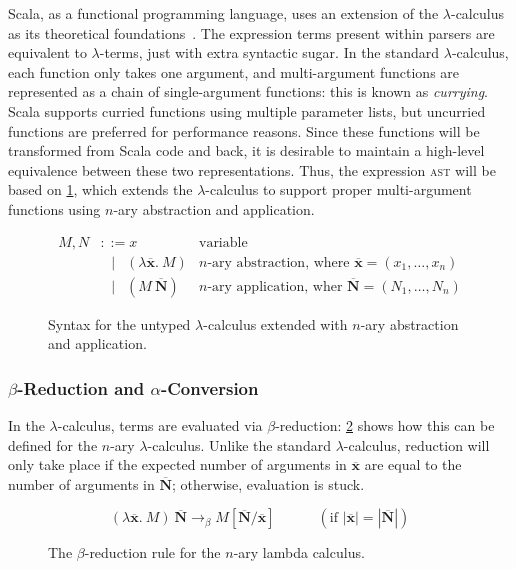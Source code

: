 \documentclass[../../../main.tex]{subfiles}
\begin{document}
Scala, as a functional programming language, uses an extension of the $\lambda$-calculus~\cite{church_lambda_1936} as its theoretical foundations~\cite{cremet_core_2006,amin_essence_2016}.
The expression terms present within parsers are equivalent to $\lambda$-terms, just with extra syntactic sugar.
In the standard $\lambda$-calculus, each function only takes one argument, and multi-argument functions are represented as a chain of single-argument functions: this is known as \emph{currying}.
Scala supports curried functions using multiple parameter lists, but uncurried functions are preferred for performance reasons.
Since these functions will be transformed from Scala code and back, it is desirable to maintain a high-level equivalence between these two representations.
Thus, the expression \textsc{ast} will be based on \cref{fig:lambda-calculus}, which extends the $\lambda$-calculus to support proper multi-argument functions using $n$-ary abstraction and application.

\begin{figure}
\begin{align*}
M, N &\mathrel{::=} x & \text{variable} \\
&\mathrel{\enspace\mid\enspace} (\lambda \overline{\mathbf{x}}.\ M) & \text{$n$-ary abstraction, where } \overline{\mathbf{x}} = (x_1, \ldots, x_n) \\
&\mathrel{\enspace\mid\enspace} (M\ \overline{\mathbf{N}}) & \text{$n$-ary application, wher } \overline{\mathbf{N}} = (N_1, \ldots, N_n)
\end{align*}
\caption{Syntax for the untyped $\lambda$-calculus extended with $n$-ary abstraction and application.}
\label{fig:lambda-calculus}
\end{figure}

\subsubsection{$\beta$-Reduction and $\alpha$-Conversion}
In the $\lambda$-calculus, terms are evaluated via $\beta$-reduction: \cref{fig:beta-reduction} shows how this can be defined for the $n$-ary $\lambda$-calculus.
Unlike the standard $\lambda$-calculus, reduction will only take place if the expected number of arguments in $\overline{\mathbf{x}}$ are equal to the number of arguments in $\overline{\mathbf{N}}$; otherwise, evaluation is stuck.

\begin{figure}[htbp]
\begin{equation*}
(\lambda \overline{\mathbf{x}} .\ M)\ \overline{\mathbf{N}} \rightarrow_\beta M[\overline{\mathbf{N}}/\overline{\mathbf{x}}] \hspace{3em} (\text{if } | \overline{\mathbf{x}} | = | \overline{\mathbf{N}} |)
\end{equation*}
\caption{The $\beta$-reduction rule for the $n$-ary lambda calculus.}
\label{fig:beta-reduction}
\end{figure}
\end{document}
